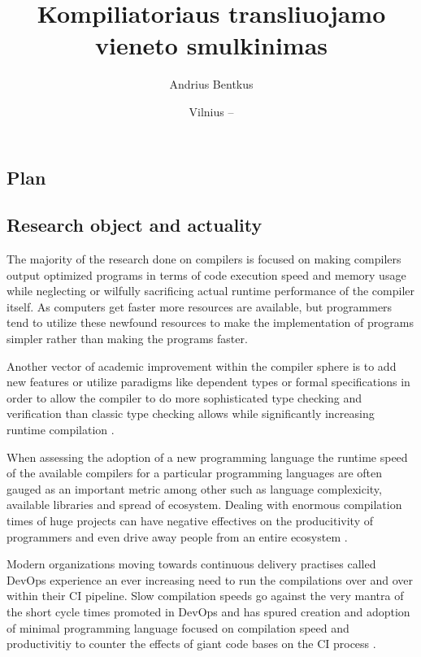\documentclass{VUMIFPSbakalaurinis}
\institute{Informatikos institutas}  %
\title{Kompiliatoriaus transliuojamo vieneto smulkinimas}
\author{Andrius Bentkus}
\date{Vilnius – \the\year}
\begin{document}
\maketitle


\begin{samepage}
\section{Plan}
\subsection{Research object and actuality}
The majority of the research done on compilers is focused on making compilers output optimized programs in terms of code execution speed and memory usage \cite{lopes2018future} while neglecting or wilfully sacrificing \cite{fast2019compilers} actual runtime performance of the compiler itself.
As computers get faster more resources are available, but programmers tend to utilize these newfound resources to make the implementation of programs simpler rather than making the programs faster\cite{Wirth1995}.

Another vector of academic improvement within the compiler sphere is to add new features or utilize paradigms like dependent types or formal specifications\cite{RustVerification} in order to allow the compiler to do more sophisticated type checking and verification than classic type checking allows while significantly increasing runtime compilation .

When assessing the adoption of a new programming language the runtime speed of the available compilers for a particular programming languages are often gauged as an important metric\cite{ScalaSlow} among other such as language complexicity, available libraries and spread of ecosystem.
Dealing with enormous compilation times of huge projects can have negative effectives on the producitivity of programmers and even drive away people from an entire ecosystem \cite{ScalaReallySlow} \cite{ScalaSlow}.

Modern organizations moving towards continuous delivery practises called DevOps \cite{DevOps} experience an ever increasing need to run the compilations over and over within their CI pipeline.
Slow compilation speeds go against the very mantra of the short cycle times promoted in DevOps and has spured creation and adoption of minimal programming language focused on compilation speed and productivitiy to counter the effects of giant code bases on the CI process\cite{TheGoProgrammingLanguage} \cite{GoGoogle}.


\end{samepage}
\end{document}
